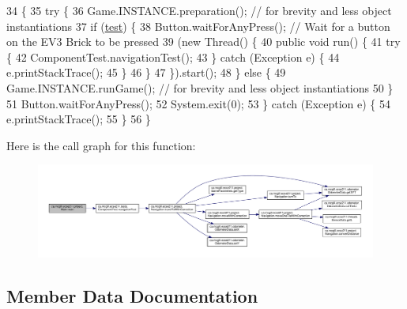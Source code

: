 \begin{DoxyCode}
34                                          \{
35     \textcolor{keywordflow}{try} \{
36       Game.INSTANCE.preparation(); \textcolor{comment}{// for brevity and less object instantiations}
37       \textcolor{keywordflow}{if} (\hyperlink{classca_1_1mcgill_1_1ecse211_1_1project_1_1_main_af6f7b8fffddcf855f74fe128d2e23ea1}{test}) \{
38         Button.waitForAnyPress(); \textcolor{comment}{// Wait for a button on the EV3 Brick to be pressed}
39         (\textcolor{keyword}{new} Thread() \{
40           \textcolor{keyword}{public} \textcolor{keywordtype}{void} run() \{
41             \textcolor{keywordflow}{try} \{
42               ComponentTest.navigationTest();
43             \} \textcolor{keywordflow}{catch} (Exception e) \{
44               e.printStackTrace();
45             \}
46           \}
47         \}).start();
48       \} \textcolor{keywordflow}{else} \{
49         Game.INSTANCE.runGame(); \textcolor{comment}{// for brevity and less object instantiations}
50       \}
51       Button.waitForAnyPress();
52       System.exit(0);
53     \} \textcolor{keywordflow}{catch} (Exception e) \{
54       e.printStackTrace();
55     \}
56   \}
\end{DoxyCode}
Here is the call graph for this function\+:
\nopagebreak
\begin{figure}[H]
\begin{center}
\leavevmode
\includegraphics[width=350pt]{classca_1_1mcgill_1_1ecse211_1_1project_1_1_main_af681b5dc675c13ed284071cc135f5fd3_cgraph}
\end{center}
\end{figure}


\subsection{Member Data Documentation}
\mbox{\label{classca_1_1mcgill_1_1ecse211_1_1project_1_1_main_af6f7b8fffddcf855f74fe128d2e23ea1}} 
